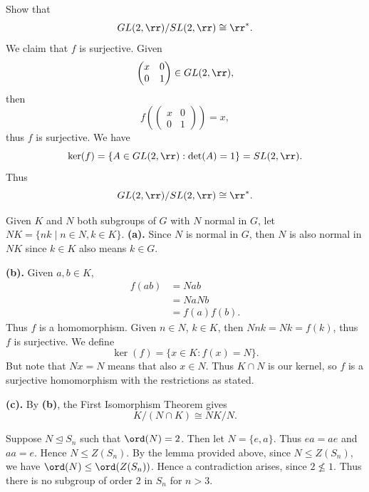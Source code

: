 \begin{problem}[Exercise 16]{
    Show that
    \[
        GL(2,\rr)/SL(2,\rr) \cong \rr^*.
    \]
}
    We claim that $f$ is surjective.
    Given
    \[
        \begin{pmatrix}
            x & 0\\
            0 & 1
        \end{pmatrix}
        \in GL(2,\rr),
    \]
    then
    \[
        f\left(
             \begin{pmatrix}
                 x & 0\\
                 0 & 1
             \end{pmatrix}
        \right)=x,
    \]
    thus $f$ is surjective.
    We have
    \[
        \ker(f)=\{A \in GL(2,\rr) : \det(A)=1\}=SL(2,\rr).
    \]
    Thus
    \[
        GL(2,\rr)/SL(2,\rr)\cong \rr^*.
    \]
\end{problem}

\begin{problem}[Exercise 17]{
    Given $K$ and $N$ both subgroups of $G$ with $N$ normal in $G$, let $NK = \{nk \mid n \in N, k \in K\}$.
}
    \textbf{(a).}
    Since $N$ is normal in $G$, then $N$ is also normal in $NK$ since $k \in K$ also means $k \in G$.

    \textbf{(b).}
    Given $a,b \in K$,
    \begin{align*}
        f(ab) &= Nab\\
        &= NaNb\\
        &= f(a)f(b).
    \end{align*}
    Thus $f$ is a homomorphism.
    Given $n \in N$, $k \in K$, then $Nnk = Nk = f(k)$, thus $f$ is surjective.
    We define
    \[
        \ker(f) = \{x \in K : f(x) = N\}.
    \]
    But note that $Nx = N$ means that also $x \in N$.
    Thus $K \cap N$ is our kernel, so $f$ is a surjective homomorphism with the restrictions as stated.

    \textbf{(c).}
    By \textbf{(b)}, the First Isomorphism Theorem gives
    \[
        K/(N \cap K) \cong NK/N.
    \]
\end{problem}

\begin{problem}[Exercise 18]{
    Suppose $N \trianglelefteq S_n$ such that $\ord(N)=2$.
}
    Then let $N=\{e,a\}$.
    Thus $ea = ae$ and $aa=e$.
    Hence $N \leq Z(S_n)$.
    By the lemma provided above, since $N \leq Z(S_n)$, we have $\ord(N) \leq \ord(Z(S_n))$.
    Hence a contradiction arises, since $2 \nleq 1$.
    Thus there is no subgroup of order $2$ in $S_n$ for $n > 3$.
\end{problem}

